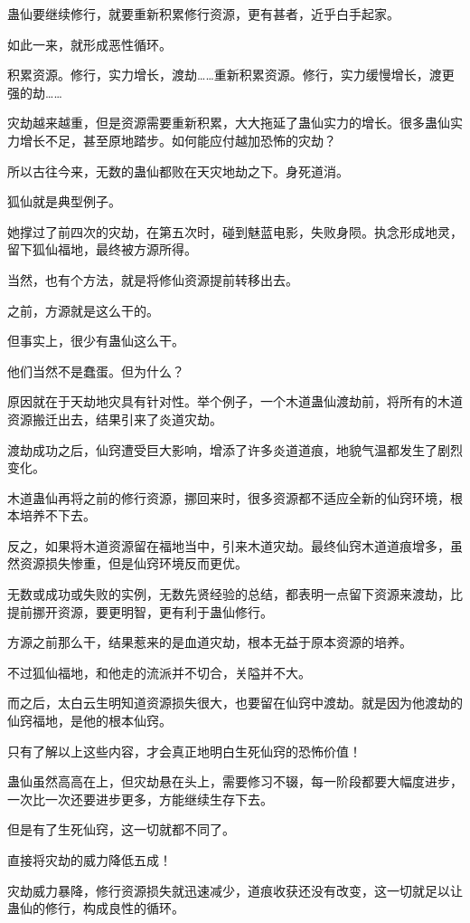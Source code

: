 \begin{this_body}
蛊仙要继续修行，就要重新积累修行资源，更有甚者，近乎白手起家。

如此一来，就形成恶性循环。

积累资源。修行，实力增长，渡劫……重新积累资源。修行，实力缓慢增长，渡更强的劫……

灾劫越来越重，但是资源需要重新积累，大大拖延了蛊仙实力的增长。很多蛊仙实力增长不足，甚至原地踏步。如何能应付越加恐怖的灾劫？

所以古往今来，无数的蛊仙都败在天灾地劫之下。身死道消。

狐仙就是典型例子。

她撑过了前四次的灾劫，在第五次时，碰到魅蓝电影，失败身陨。执念形成地灵，留下狐仙福地，最终被方源所得。

当然，也有个方法，就是将修仙资源提前转移出去。

之前，方源就是这么干的。

但事实上，很少有蛊仙这么干。

他们当然不是蠢蛋。但为什么？

原因就在于天劫地灾具有针对性。举个例子，一个木道蛊仙渡劫前，将所有的木道资源搬迁出去，结果引来了炎道灾劫。

渡劫成功之后，仙窍遭受巨大影响，增添了许多炎道道痕，地貌气温都发生了剧烈变化。

木道蛊仙再将之前的修行资源，挪回来时，很多资源都不适应全新的仙窍环境，根本培养不下去。

反之，如果将木道资源留在福地当中，引来木道灾劫。最终仙窍木道道痕增多，虽然资源损失惨重，但是仙窍环境反而更优。

无数或成功或失败的实例，无数先贤经验的总结，都表明一点留下资源来渡劫，比提前挪开资源，要更明智，更有利于蛊仙修行。

方源之前那么干，结果惹来的是血道灾劫，根本无益于原本资源的培养。

不过狐仙福地，和他走的流派并不切合，关隘并不大。

而之后，太白云生明知道资源损失很大，也要留在仙窍中渡劫。就是因为他渡劫的仙窍福地，是他的根本仙窍。

只有了解以上这些内容，才会真正地明白生死仙窍的恐怖价值！

蛊仙虽然高高在上，但灾劫悬在头上，需要修习不辍，每一阶段都要大幅度进步，一次比一次还要进步更多，方能继续生存下去。

但是有了生死仙窍，这一切就都不同了。

直接将灾劫的威力降低五成！

灾劫威力暴降，修行资源损失就迅速减少，道痕收获还没有改变，这一切就足以让蛊仙的修行，构成良性的循环。


\end{this_body}
